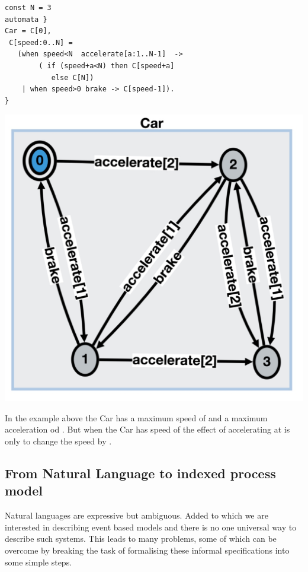 \documentclass[]{article}
\begin{document}
\begin{minipage}{0.52\textwidth}
\begin{verbatim}
const N = 3
automata }
Car = C[0],
 C[speed:0..N] = 
   (when speed<N  accelerate[a:1..N-1]  -> 
        ( if (speed+a<N) then C[speed+a] 
           else C[N])
    | when speed>0 brake -> C[speed-1]).
}\end{verbatim} 
\end{minipage}
\begin{minipage}{0.35\textwidth}
 \includegraphics[scale=0.15]{Car.jpg} 
 \end{minipage}

In the example above the {\sf Car} has a maximum speed of {} and a maximum acceleration od {}. But when the {\sf Car} has speed of {} the effect of accelerating at {} is only to change the speed by {}. 

 \subsection{From Natural Language to indexed process model}
 Natural languages are expressive but ambiguous.  Added to which we are interested in describing event based models and there is no one universal way to describe such systems. This leads to many problems, some of which can be overcome by breaking the task of formalising these informal specifications into some simple steps.
 
\end{document}
